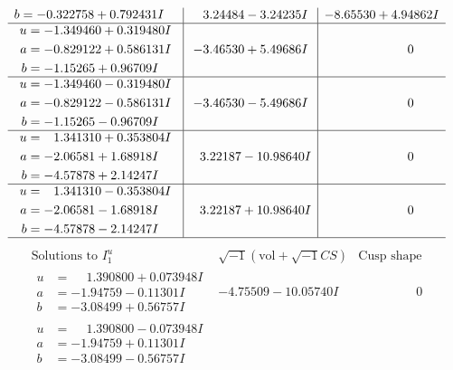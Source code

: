 \documentclass[1p]{elsarticle_modified}
\theoremstyle{definition}
\newcommand{\I}{\sqrt{-1}}
\begin{document}
$$\begin{array}{c|c|c}
\begin{aligned}
b &= -0.322758 + 0.792431 I\end{aligned}
 & \phantom{-}3.24484 - 3.24235 I & -8.65530 + 4.94862 I \\ \hline\begin{aligned}
u &= -1.349460 + 0.319480 I \\
a &= -0.829122 + 0.586131 I \\
b &= -1.15265 + 0.96709 I\end{aligned}
 & -3.46530 + 5.49686 I & \phantom{-0.000000 } 0 \\ \hline\begin{aligned}
u &= -1.349460 - 0.319480 I \\
a &= -0.829122 - 0.586131 I \\
b &= -1.15265 - 0.96709 I\end{aligned}
 & -3.46530 - 5.49686 I & \phantom{-0.000000 } 0 \\ \hline\begin{aligned}
u &= \phantom{-}1.341310 + 0.353804 I \\
a &= -2.06581 + 1.68918 I \\
b &= -4.57878 + 2.14247 I\end{aligned}
 & \phantom{-}3.22187 - 10.98640 I & \phantom{-0.000000 } 0 \\ \hline\begin{aligned}
u &= \phantom{-}1.341310 - 0.353804 I \\
a &= -2.06581 - 1.68918 I \\
b &= -4.57878 - 2.14247 I\end{aligned}
 & \phantom{-}3.22187 + 10.98640 I & \phantom{-0.000000 } 0\\
 \hline 
 \end{array}$$\newpage$$\begin{array}{c|c|c}  
\text{Solutions to }I^u_{1}& \I (\text{vol} + \sqrt{-1}CS) & \text{Cusp shape}\\
 \hline 
\begin{aligned}
u &= \phantom{-}1.390800 + 0.073948 I \\
a &= -1.94759 - 0.11301 I \\
b &= -3.08499 + 0.56757 I\end{aligned}
 & -4.75509 - 10.05740 I & \phantom{-0.000000 } 0 \\ \hline\begin{aligned}
u &= \phantom{-}1.390800 - 0.073948 I \\
a &= -1.94759 + 0.11301 I \\
b &= -3.08499 - 0.56757 I\end{aligned}

\end{array}$$
\end{document}
